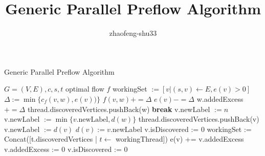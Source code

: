 \documentclass{article}
\title{Generic Parallel Preflow Algorithm}
\author{zhaofeng-shu33}
\begin{document}
\maketitle
\begin{algorithm}
\caption{Generic Parallel Preflow Algorithm}
\begin{algorithmic}[1]
\REQUIRE $G=(V,E),c,s,t$
\ENSURE optimal flow $f$
\STATE workingSet $:=[v | (s, v) \leftarrow E, e(v) > 0]$
\STATE $\Delta := \min\{c_f(v, w), e(v))\}$
\STATE $f(v, w) += \Delta$
\STATE $e(v) -= \Delta$
\STATE w.addedExcess $+= \Delta$
\STATE thread.discoveredVertices.pushBack(w)
\ENDIF
\ENDIF
{}
\STATE \textbf{break}
\ENDIF
\ENDFOR
\ENDFOR
{}
\STATE v.newLabel $:= n$
\STATE v.newLabel $:= \min\{v.\textrm{newLabel}, d(w)\}$
\ENDFOR
{}
\STATE thread.discoveredVertices.pushBack(v)
\ENDIF
\ELSE
\STATE v.newLabel $:= d(v)$
\ENDIF
\ENDFOR
{}
\STATE $d(v) :=v$.newLabel
\STATE v.isDiscovered := 0
\ENDFOR
\STATE workingSet := Concat([t.discoveredVertices | $t \leftarrow$ workingThread])
\STATE e(v) += v.addedExcess
\STATE v.addedExcess := 0
\STATE v.isDiscovered := 0
\ENDFOR
\ENDWHILE
\end{algorithmic}
\end{algorithm}
\end{document}
